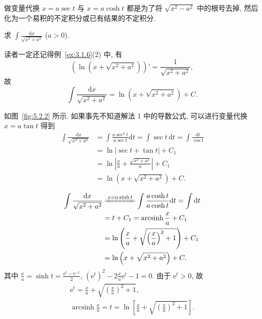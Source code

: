 做变量代换 $x=a\sec t$ 与 $x=a\cosh t$ 都是为了将 $\sqrt{x^{2}-a^{2}}$ 中的根号去掉, 然后化为一个易积的不定积分或已有结果的不定积分.

\begin{example}\label{ex:5.2.4}
求 $\int\frac{\mathrm{d}x}{\sqrt{x^{2}+a^{2}}}$ ($a>0$).
\end{example}

\begin{solution}[解法 1]
读者一定还记得例~\ref{ex:3.1.6}(2) 中, 有
\[
\left(\ln(x+\sqrt{x^{2}+a^{2}})\right)'=\frac{1}{\sqrt{x^{2}+a^{2}}},
\]
故
\[
\int\frac{\mathrm{d}x}{\sqrt{x^{2}+a^{2}}}=\ln(x+\sqrt{x^{2}+a^{2}})+C.
\]
\end{solution}

\begin{solution}[解法 2]
如图~\ref{fig:5.2.2} 所示. 如果事先不知道解法 1 中的导数公式, 可以进行变量代换 $x=a\tan t$ 得到
\begin{align*}
\int\frac{\mathrm{d}x}{\sqrt{x^{2}+a^{2}}}&=\int\frac{a\sec^{2}t}{a\sec t}\mathrm{d}t=\int\sec t\,\mathrm{d}t=\int\frac{\mathrm{d}t}{\cos t}\\
&=\ln|\sec t+\tan t|+C_{1}\\
&=\ln\left|\frac{x}{a}+\frac{\sqrt{x^{2}+a^{2}}}{a}\right|+C_{1}\\
&=\ln(x+\sqrt{x^{2}+a^{2}})+C.
\end{align*}
\end{solution}

\begin{solution}[解法 3]
\begin{align*}
\int\frac{\mathrm{d}x}{\sqrt{x^{2}+a^{2}}}
&\xlongequal{x=a\sinh t}\int\frac{a\cosh t}{a\cosh t}\mathrm{d}t=\int\mathrm{d}t\\
&=t+C_{1}=\operatorname{arcsinh}\frac{x}{a}+C_{1}\\
&=\ln\left(\frac{x}{a}+\sqrt{\left(\frac{x}{a}\right)^{2}+1}\right)+C_{1}\\
&=\ln\left(x+\sqrt{x^{2}+a^{2}}\right)+C.
\end{align*}
其中 $\frac{x}{a}=\sinh t=\frac{\mathrm{e}^{t}-\mathrm{e}^{-t}}{2}$, $(\mathrm{e}^{t})^{2}-2\frac{x}{a}\mathrm{e}^{t}-1=0$. 由于 $\mathrm{e}^{t}>0$, 故
\begin{gather*}
\mathrm{e}^{t}=\frac{x}{a}+\sqrt{\left(\frac{x}{a}\right)^{2}+1},\\
\operatorname{arcsinh}\frac{x}{a}=t=\ln\left[\frac{x}{a}+\sqrt{\left(\frac{x}{a}\right)^{2}+1}\right].
\end{gather*}
\end{solution}

